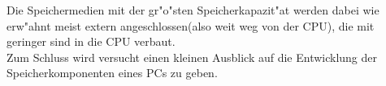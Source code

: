 Die Speichermedien mit der gr"o"sten Speicherkapazit"at werden dabei wie erw"ahnt meist extern angeschlossen(also \glqq weit weg\grqq{} von der CPU), die mit geringer sind in die CPU verbaut.
\\
Zum Schluss wird versucht einen kleinen Ausblick auf die Entwicklung der Speicherkomponenten eines PCs zu geben.


